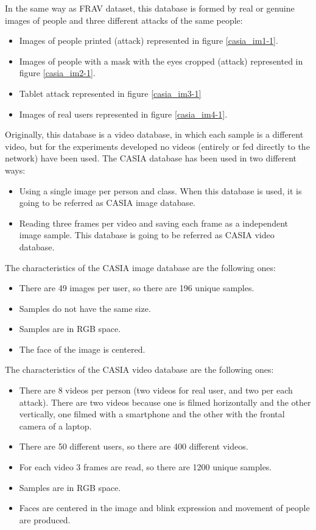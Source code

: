 In the same way as FRAV dataset, this database is formed by real or genuine images of people and three different attacks of the same people:
\begin{itemize}[noitemsep,topsep=8pt,parsep=0pt,partopsep=20pt]
 \item Images of people printed (attack) represented in figure \ref{casia_im1-1}.
 \item Images of people with a mask with the eyes cropped (attack) represented in figure \ref{casia_im2-1}.
 \item Tablet attack represented in figure \ref{casia_im3-1}
  \item Images of real users represented in figure \ref{casia_im4-1}.
 \end{itemize}

Originally, this database is a video database, in which each sample is a different video, but for the experiments developed no videos (entirely or fed directly to the network) have been used. The CASIA database has been used in two different ways:
\begin{itemize}
 \item Using a single image per person and class. When this database is used, it is going to be referred as CASIA image database.
 \item Reading three frames per video and saving each frame as a independent image sample. This database is going to be referred as CASIA video database.
\end{itemize}

The characteristics of the CASIA image database are the following ones:
\begin{itemize}[noitemsep,topsep=8pt,parsep=0pt,partopsep=20pt]
\item There are 49 images per user, so there are 196 unique samples.
\item Samples do not have the same size.
\item Samples are in RGB space.
\item The face of the image is centered.
\end{itemize}

The characteristics of the CASIA video database are the following ones:
\begin{itemize}
\item There are 8 videos per person (two videos for real user, and two per each attack). There are two videos because one is filmed horizontally and the other vertically, one filmed with a smartphone and the other with the frontal camera of a laptop.
\item There are 50 different users, so there are 400 different videos.
\item For each video 3 frames are read, so there are 1200 unique samples.
\item Samples are in RGB space.
\item Faces are centered in the image and blink expression and movement of people are produced.
\end{itemize}

